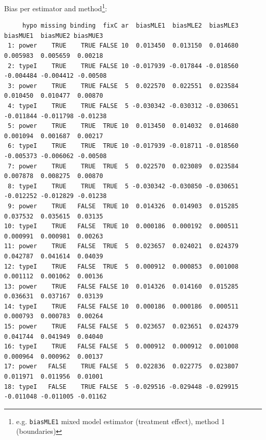 \documentclass[12pt]{article}
\begin{document}
Bias per estimator and method\footnote{e.g. \texttt{biasMLE1} mixed model
estimator (treatment effect), method 1 (boundaries)}:
\begin{adjustwidth}{-1cm}{-1cm}
\begin{verbatim}
     hypo missing binding  fixC ar  biasMLE1  biasMLE2  biasMLE3  biasMUE1  biasMUE2 biasMUE3
 1: power    TRUE    TRUE FALSE 10  0.013450  0.013150  0.014680  0.005983  0.005659  0.00218
 2: typeI    TRUE    TRUE FALSE 10 -0.017939 -0.017844 -0.018560 -0.004484 -0.004412 -0.00508
 3: power    TRUE    TRUE FALSE  5  0.022570  0.022551  0.023584  0.010450  0.010477  0.00870
 4: typeI    TRUE    TRUE FALSE  5 -0.030342 -0.030312 -0.030651 -0.011844 -0.011798 -0.01238
 5: power    TRUE    TRUE  TRUE 10  0.013450  0.014032  0.014680  0.001094  0.001687  0.00217
 6: typeI    TRUE    TRUE  TRUE 10 -0.017939 -0.018711 -0.018560 -0.005373 -0.006062 -0.00508
 7: power    TRUE    TRUE  TRUE  5  0.022570  0.023089  0.023584  0.007878  0.008275  0.00870
 8: typeI    TRUE    TRUE  TRUE  5 -0.030342 -0.030850 -0.030651 -0.012252 -0.012829 -0.01238
 9: power    TRUE   FALSE  TRUE 10  0.014326  0.014903  0.015285  0.037532  0.035615  0.03135
10: typeI    TRUE   FALSE  TRUE 10  0.000186  0.000192  0.000511  0.000991  0.000981  0.00263
11: power    TRUE   FALSE  TRUE  5  0.023657  0.024021  0.024379  0.042787  0.041614  0.04039
12: typeI    TRUE   FALSE  TRUE  5  0.000912  0.000853  0.001008  0.001112  0.001062  0.00136
13: power    TRUE   FALSE FALSE 10  0.014326  0.014160  0.015285  0.036631  0.037167  0.03139
14: typeI    TRUE   FALSE FALSE 10  0.000186  0.000186  0.000511  0.000793  0.000783  0.00264
15: power    TRUE   FALSE FALSE  5  0.023657  0.023651  0.024379  0.041744  0.041949  0.04040
16: typeI    TRUE   FALSE FALSE  5  0.000912  0.000912  0.001008  0.000964  0.000962  0.00137
17: power   FALSE    TRUE FALSE  5  0.022836  0.022775  0.023807  0.011971  0.011956  0.01001
18: typeI   FALSE    TRUE FALSE  5 -0.029516 -0.029448 -0.029915 -0.011048 -0.011005 -0.01162
\end{verbatim}
\end{adjustwidth}
\end{document}
